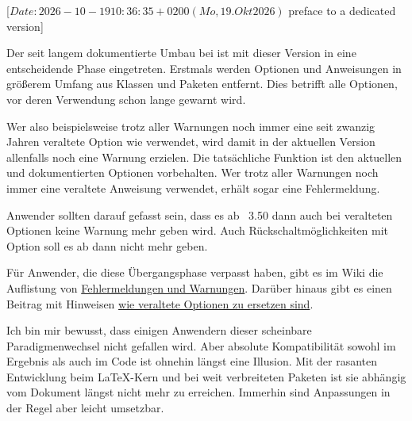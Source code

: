 %
%
%
%
%

                 [$Date: 2026-10-19 10:36:35 +0200 (Mo, 19. Okt 2026) $
                  preface to a dedicated version]


Der seit langem dokumentierte Umbau bei \KOMAScript{} ist mit dieser Version
in eine entscheidende Phase eingetreten. Erstmals werden Optionen und
Anweisungen in größerem Umfang aus Klassen und Paketen entfernt. Dies betrifft
alle Optionen, vor deren Verwendung schon lange gewarnt wird.

Wer also beispielsweise trotz aller Warnungen noch immer eine seit zwanzig
Jahren veraltete Option wie  verwendet, wird damit in
der aktuellen Version allenfalls noch eine Warnung erzielen. Die tatsächliche
Funktion ist den aktuellen und dokumentierten Optionen vorbehalten.
Wer trotz aller Warnungen noch immer eine veraltete Anweisung verwendet,
erhält sogar eine Fehlermeldung.

Anwender sollten darauf gefasst sein, dass es ab \KOMAScript~3.50 dann auch
bei veralteten Optionen keine Warnung mehr geben wird. Auch
Rückschaltmöglichkeiten mit Option  soll es ab dann nicht mehr
geben.

Für Anwender, die diese Übergangsphase verpasst haben, gibt es im Wiki die
Auflistung von
\href{https://sourceforge.net/p/koma-script/wiki-de/Messages/}{Fehlermeldungen
  und Warnungen}. Darüber hinaus gibt es einen Beitrag mit Hinweisen
\href{https://sourceforge.net/p/koma-script/wiki-de/HowTo_DeprecatedOptions/}{wie
  veraltete Optionen zu ersetzen sind}.

Ich bin mir bewusst, dass einigen Anwendern dieser scheinbare
Paradigmenwechsel nicht gefallen wird. Aber absolute Kompatibilität sowohl im
Ergebnis als auch im Code ist ohnehin längst eine Illusion. Mit der rasanten
Entwicklung beim \LaTeX-Kern und bei weit verbreiteten Paketen ist sie
abhängig vom Dokument längst nicht mehr zu erreichen. Immerhin sind
Anpassungen in der Regel aber leicht umsetzbar.

